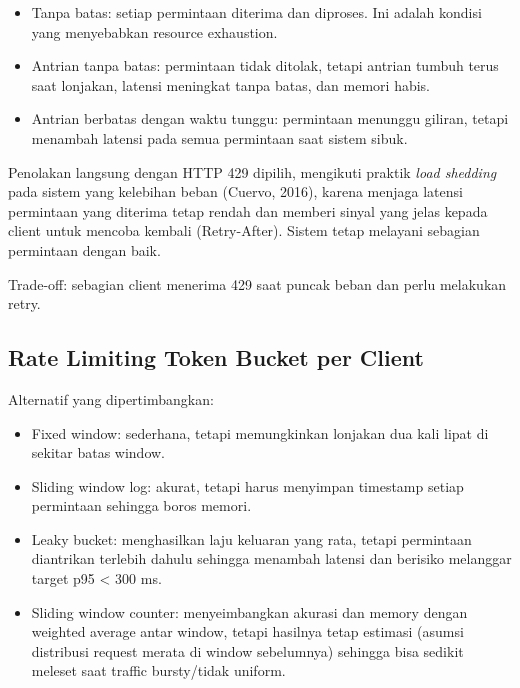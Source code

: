 \begin{itemize}
\tightlist
\item
  Tanpa batas: setiap permintaan diterima dan diproses. Ini adalah kondisi yang menyebabkan resource exhaustion.\\
\item
  Antrian tanpa batas: permintaan tidak ditolak, tetapi antrian tumbuh terus saat lonjakan, latensi meningkat tanpa batas, dan memori habis.\\
\item
  Antrian berbatas dengan waktu tunggu: permintaan menunggu giliran, tetapi menambah latensi pada semua permintaan saat sistem sibuk.
\end{itemize}

Penolakan langsung dengan HTTP 429 dipilih, mengikuti praktik \emph{load shedding} pada sistem yang kelebihan beban (Cuervo, 2016), karena menjaga latensi permintaan yang diterima tetap rendah dan memberi sinyal yang jelas kepada client untuk mencoba kembali (Retry-After). Sistem tetap melayani sebagian permintaan dengan baik.

Trade-off: sebagian client menerima 429 saat puncak beban dan perlu melakukan retry.

\subsection{Rate Limiting Token Bucket per Client}\label{sec:p2-ratelimit}

Alternatif yang dipertimbangkan:

\begin{itemize}
\tightlist
\item
  Fixed window: sederhana, tetapi memungkinkan lonjakan dua kali lipat di sekitar batas window.\\
\item
  Sliding window log: akurat, tetapi harus menyimpan timestamp setiap permintaan sehingga boros memori.\\
\item
  Leaky bucket: menghasilkan laju keluaran yang rata, tetapi permintaan diantrikan terlebih dahulu sehingga menambah latensi dan berisiko melanggar target p95 \textless{} 300 ms.\\
\item
  Sliding window counter: menyeimbangkan akurasi dan memory dengan weighted average antar window, tetapi hasilnya tetap estimasi (asumsi distribusi request merata di window sebelumnya) sehingga bisa sedikit meleset saat traffic bursty/tidak uniform.
\end{itemize}

